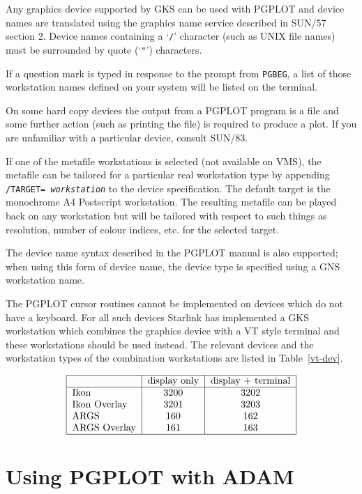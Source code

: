 Any graphics device supported by GKS can be used with PGPLOT and device
names are translated using the graphics name service described in SUN/57
section 2. Device names containing a `{\tt /}' character (such as UNIX file
names) must be surrounded by quote (`{\tt"}') characters.

If a question mark is typed in response to the prompt from {\tt PGBEG}, a
list of those workstation names defined on your system will be listed on the
terminal. 

On some hard copy devices the output from a PGPLOT program is a file and
some further action (such as printing the file) is required to produce a plot.
If you are unfamiliar with a particular device, consult SUN/83.

If one of the metafile workstations is selected (not available on VMS), 
the metafile can be tailored
for a particular real workstation type by appending {\tt /TARGET={\em 
workstation}} to the device specification. The default target is the
monochrome A4 Postscript workstation. The resulting metafile can be played
back on any workstation but will be tailored with respect to such things as
resolution, number of colour indices, etc. for the selected target.

The device name syntax described in the PGPLOT manual is also
supported; when using this form of device name, the device type is specified
using a GNS workstation name.

The PGPLOT cursor routines cannot be implemented on devices which do not have a
keyboard. For all such devices Starlink has implemented a GKS workstation which
combines the graphics device with a VT style terminal and these
workstations should be used instead. The relevant devices and the workstation
types of the combination workstations are listed in Table~\ref{vt-dev}.
\begin{table}
\caption{GKS workstation types}\label{vt-dev}
\[\begin{tabular}{|l|c|c|} \hline
&display only &display $+$ terminal \\
\hline
Ikon & 3200 & 3202 \\
Ikon Overlay & 3201 & 3203 \\
ARGS & 160 & 162 \\
ARGS Overlay & 161 &  163 \\
\hline \end{tabular}\]
\end{table}

\section{Using PGPLOT with ADAM}

